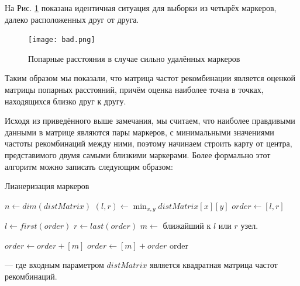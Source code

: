 \documentclass{matmex-diploma-custom}
\begin{document}
На Рис. \ref{fig:fig2} показана идентичная ситуация для выборки из
четырёх маркеров, далеко расположенных друг от друга.

\begin{figure}[h]
 \centering
  \texttt{[image: bad.png]}
  \caption[width=0.4\textwidth]{Попарные расстояния в случае сильно
    удалённых маркеров}
  \label{fig:fig2}
\end{figure}

Таким образом мы показали, что матрица частот рекомбинации является
оценкой матрицы попарных расстояний, причём оценка наиболее точна в
точках, находящихся близко друг к другу.

Исходя из приведённого выше замечания, мы считаем, что наиболее
правдивыми данными в матрице являются пары маркеров, с минимальными
значениями частоты рекомбинаций между ними, поэтому начинаем строить
карту от центра, представимого двумя самыми близкими маркерами. Более
формально этот алгоритм можно записать следующим образом:
\begin{algorithm}
  \caption{Лианеризация маркеров}
  \label{algo:linmark}
  \begin{algorithmic}[1]

    \State $n \gets dim(distMatrix)$
    \State $(l, r) \gets \min_{x, y} distMatrix[x][y]$
    \State $order \gets [l, r]$

    \State $l \gets first(order)$
    \State $r \gets last(order)$
    \State $m \gets $ ближайший к $l$ или $r$ узел.

    \State $order \gets order + [m]$
    \Else
    \State $order \gets [m] + order$
    \EndIf
    \EndWhile
    \State \Return order
    \EndFunction
  \end{algorithmic}
\end{algorithm}

--- где входным параметром $distMatrix$ является квадратная матрица
частот рекомбинаций.
\end{document}
